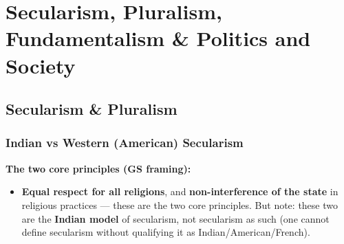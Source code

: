 \chapter{Secularism, Pluralism, Fundamentalism \& Politics and Society}


\section{Secularism \& Pluralism}

\subsection{Indian vs Western (American) Secularism}

\begin{KeyConcept}
\textbf{The two core principles (GS framing):}
\begin{itemize}
\item \textbf{Equal respect for all religions}, and \textbf{non-interference of the state} in religious practices --- these are the two core principles. But note: these two are the \textbf{Indian model} of secularism, not secularism as such (one cannot define secularism without qualifying it as Indian/American/French).
\end{itemize}
\end{KeyConcept}

